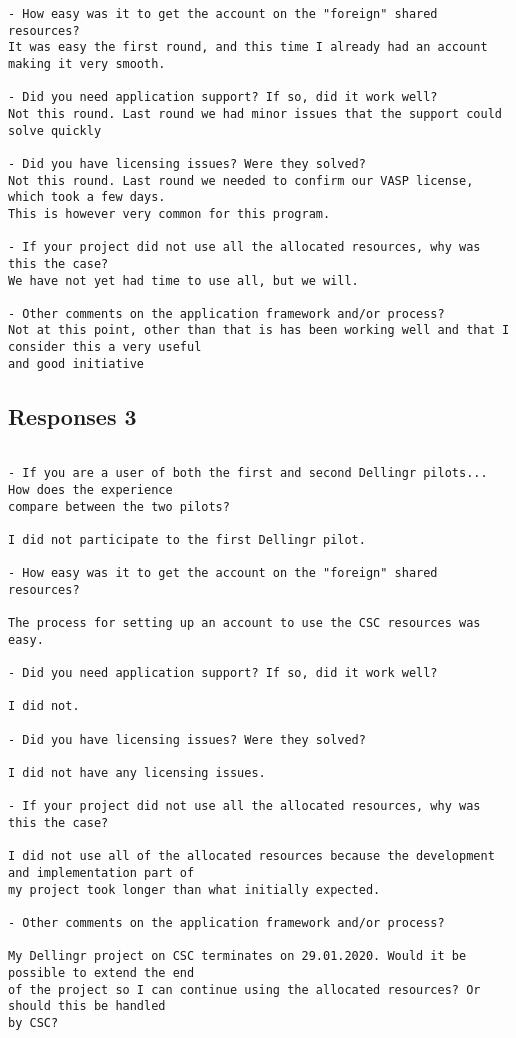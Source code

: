 {\begin{verbatim}
- How easy was it to get the account on the "foreign" shared resources?
It was easy the first round, and this time I already had an account making it very smooth.

- Did you need application support? If so, did it work well?
Not this round. Last round we had minor issues that the support could solve quickly

- Did you have licensing issues? Were they solved?
Not this round. Last round we needed to confirm our VASP license, which took a few days. 
This is however very common for this program.

- If your project did not use all the allocated resources, why was this the case?
We have not yet had time to use all, but we will.

- Other comments on the application framework and/or process?
Not at this point, other than that is has been working well and that I consider this a very useful 
and good initiative
\end{verbatim}
\subsection*{Responses 3}
\begin{verbatim}

- If you are a user of both the first and second Dellingr pilots... How does the experience
compare between the two pilots?

I did not participate to the first Dellingr pilot.

- How easy was it to get the account on the "foreign" shared resources?

The process for setting up an account to use the CSC resources was easy.

- Did you need application support? If so, did it work well?

I did not.

- Did you have licensing issues? Were they solved?

I did not have any licensing issues.

- If your project did not use all the allocated resources, why was this the case?

I did not use all of the allocated resources because the development and implementation part of 
my project took longer than what initially expected.

- Other comments on the application framework and/or process?

My Dellingr project on CSC terminates on 29.01.2020. Would it be possible to extend the end 
of the project so I can continue using the allocated resources? Or should this be handled 
by CSC?
\end{verbatim}
}
